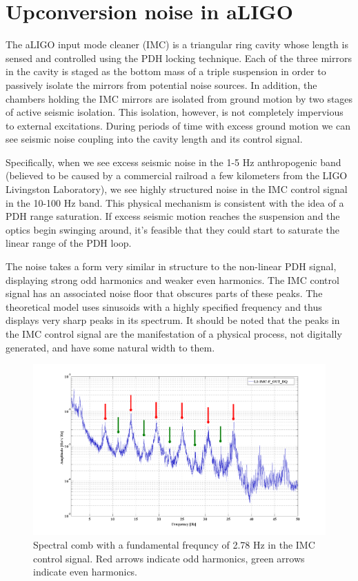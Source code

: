 \section{Upconversion noise in aLIGO}
The aLIGO input mode cleaner (IMC) is a triangular ring cavity whose length is sensed and controlled using the PDH locking technique. Each of the three mirrors in the cavity is staged as the bottom mass of a triple suspension in order to passively isolate the mirrors from  potential noise sources. In addition, the chambers holding the IMC mirrors are isolated from ground motion by two stages of active seismic isolation. This isolation, however, is not completely impervious to external excitations. During periods of time with excess ground motion we can see seismic noise coupling into the cavity length and its control signal.

Specifically, when we see excess seismic noise in the 1-5 Hz anthropogenic band (believed to be caused by a commercial railroad a few kilometers from the LIGO Livingston Laboratory), we see highly structured noise in the IMC control signal in the 10-100 Hz band. This physical mechanism is consistent with the idea of a PDH range saturation. If excess seismic motion reaches the suspension and the optics begin swinging around, it's feasible that they could start to saturate the linear range of the PDH loop.

The noise takes a form very similar in structure to the non-linear PDH signal, displaying strong odd harmonics and weaker even harmonics. The IMC control signal has an associated noise floor that obscures parts of these peaks. The theoretical model uses sinusoids with a highly specified frequency and thus displays very sharp peaks in its spectrum. It should be noted that the peaks in the IMC control signal are the manifestation of a physical process, not digitally generated, and have some natural width to them.

\begin{figure}[h!]
\includegraphics[height=0.6\textwidth]{figures/IMCUpconversion/upconversion_comb.png}
\caption[Spectral comb in IMC control signal]{Spectral comb with a fundamental frequncy of 2.78 Hz in the IMC control signal. Red arrows indicate odd harmonics, green arrows indicate even harmonics. }
\end{figure}

